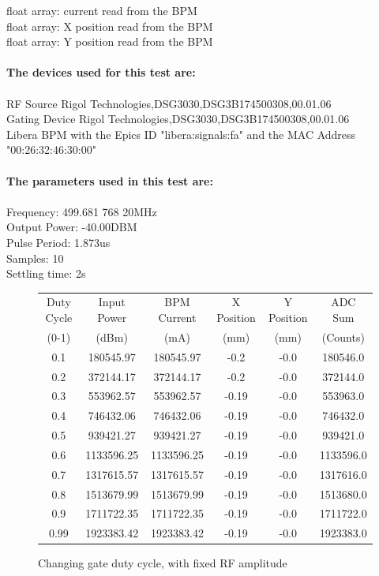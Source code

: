 \documentclass[a4paper, 11pt]{article}%
\begin{document}
            float array: current read from the BPM\\
            float array: X position read from the BPM\\
            float array: Y position read from the BPM\\~\\  
\textbf{The devices used for this test are:}\\\\%
RF Source Rigol Technologies,DSG3030,DSG3B174500308,00.01.06\\%
Gating Device Rigol Technologies,DSG3030,DSG3B174500308,00.01.06\\%
Libera BPM with the Epics ID "libera:signals:fa" and the MAC Address "00:26:32:46:30:00"\\%
\\%
\textbf{The parameters used in this test are:}\\\\%
Frequency: 499.681 768 20MHz\\%
Output Power: -40.00DBM\\%
Pulse Period: 1.873us\\%
Samples: 10\\%
Settling time: 2s\\

%
\begin{figure}[htbp]%
\centering%
\caption{Changing gate duty cycle, with fixed RF amplitude }%
\begin{tabular}{|c|c|c|c|c|c|}%
\hline%
Duty Cycle&Input Power&BPM Current&X Position&Y Position&ADC Sum\\%
(0{-}1)&(dBm)&(mA)&(mm)&(mm)&(Counts)\\%
\hline%
0.1&180545.97&180545.97&{-}0.2&{-}0.0&180546.0\\%
0.2&372144.17&372144.17&{-}0.2&{-}0.0&372144.0\\%
0.3&553962.57&553962.57&{-}0.19&{-}0.0&553963.0\\%
0.4&746432.06&746432.06&{-}0.19&{-}0.0&746432.0\\%
0.5&939421.27&939421.27&{-}0.19&{-}0.0&939421.0\\%
0.6&1133596.25&1133596.25&{-}0.19&{-}0.0&1133596.0\\%
0.7&1317615.57&1317615.57&{-}0.19&{-}0.0&1317616.0\\%
0.8&1513679.99&1513679.99&{-}0.19&{-}0.0&1513680.0\\%
0.9&1711722.35&1711722.35&{-}0.19&{-}0.0&1711722.0\\%
0.99&1923383.42&1923383.42&{-}0.19&{-}0.0&1923383.0\\%
\hline%
\end{tabular}%
\end{figure}%
\end{document}
